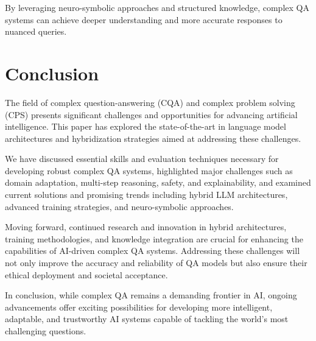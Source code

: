 \documentclass[a4paper,12pt]{article}
\begin{document}
By leveraging neuro-symbolic approaches and structured knowledge, complex QA systems can achieve deeper understanding and more accurate responses to nuanced queries.

\section{Conclusion}\label{sec:conc}

The field of complex question-answering (CQA) and complex problem solving (CPS) presents significant challenges and opportunities for advancing artificial intelligence. This paper has explored the state-of-the-art in language model architectures and hybridization strategies aimed at addressing these challenges.

We have discussed essential skills and evaluation techniques necessary for developing robust complex QA systems, highlighted major challenges such as domain adaptation, multi-step reasoning, safety, and explainability, and examined current solutions and promising trends including hybrid LLM architectures, advanced training strategies, and neuro-symbolic approaches.

Moving forward, continued research and innovation in hybrid architectures, training methodologies, and knowledge integration are crucial for enhancing the capabilities of AI-driven complex QA systems. Addressing these challenges will not only improve the accuracy and reliability of QA models but also ensure their ethical deployment and societal acceptance.

In conclusion, while complex QA remains a demanding frontier in AI, ongoing advancements offer exciting possibilities for developing more intelligent, adaptable, and trustworthy AI systems capable of tackling the world's most challenging questions.

\newpage


\end{document}

